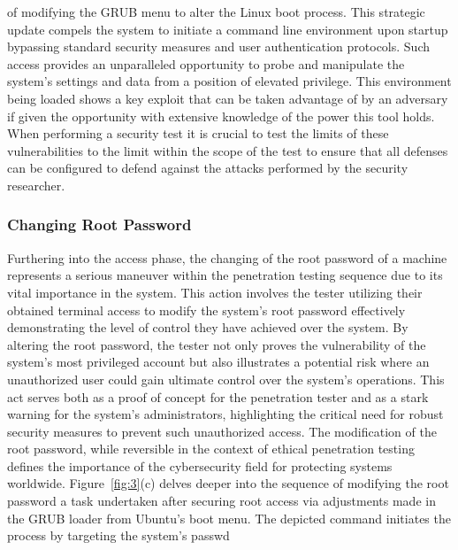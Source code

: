 \documentclass[manuscript,acmsmall,anonymous,review,screen,nonacm=true, authorversion=true]{acmart}
\begin{document}
of modifying the GRUB menu to alter the Linux boot process\cite{bash1,bash2}. This strategic update
compels the system to initiate a command line environment upon startup bypassing standard
security measures and user authentication protocols. Such access provides an unparalleled
opportunity to probe and manipulate the system's settings and data from a position of elevated
privilege. This environment being loaded shows a key exploit that can be taken advantage
of by an adversary if given the opportunity with extensive knowledge of the power this tool
holds. When performing a security test it is crucial to test the limits of these vulnerabilities
to the limit within the scope of the test to ensure that all defenses can be configured to defend
against the attacks performed by the security researcher.

\subsubsection{ Changing Root Password}
Furthering into the access phase, the changing of the root password of a machine
represents a serious maneuver within the penetration testing sequence due to its vital importance
in the system\cite{HackerOne}. This action involves the tester utilizing their obtained terminal access to
modify the system's root password effectively demonstrating the level of control they have
achieved over the system. By altering the root password, the tester not only proves the
vulnerability of the system's most privileged account but also illustrates a potential risk where an
unauthorized user could gain ultimate control over the system's operations. This act
serves both as a proof of concept for the penetration tester and as a stark warning for the system's
administrators, highlighting the critical need for robust security measures to prevent such
unauthorized access. The modification of the root password, while reversible in the
context of ethical penetration testing defines the importance of the cybersecurity field for
protecting systems worldwide.
Figure~\ref{fig:3}(c) delves deeper into the sequence of modifying the root password a task
undertaken after securing root access via adjustments made in the GRUB loader from Ubuntu's
boot menu. The depicted command initiates the process by targeting the system's passwd
\end{document}
